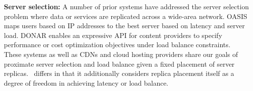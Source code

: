 

\textbf{Server selection:} A number of prior systems have addressed the server selection problem where data or services are replicated across a wide-area network. OASIS \cite{oasis} maps users based on IP addresses to the best server based on latency and server load. DONAR \cite{donar} enables an expressive API for content providers to specify performance or cost optimization objectives under load balance constraints. These systems as well as CDNs and cloud hosting providers \cite{AWS-load-balancing} share our goals of proximate server selection and load balance given a fixed placement of server replicas. \auspice\ differs in that it additionally considers replica placement itself as a degree of freedom in achieving latency or load balance.

